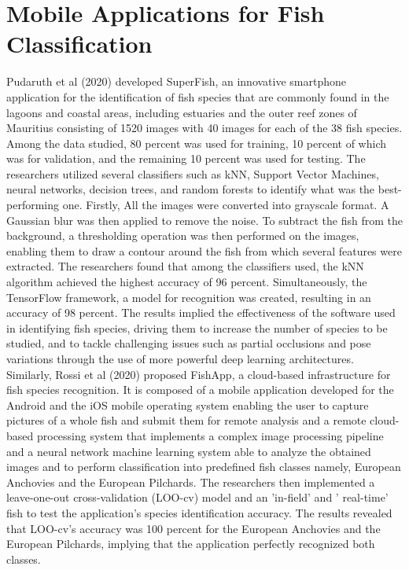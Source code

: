 \section{Mobile Applications for Fish Classification}
Pudaruth et al (2020) developed SuperFish, an innovative smartphone application for the identification of fish species that are commonly found in the lagoons and coastal areas, including estuaries and the outer reef zones of Mauritius consisting of 1520 images with 40 images for each of the 38 fish species. Among the data studied, 80 percent was used for training, 10 percent of which was for validation, and the remaining 10 percent was used for testing. The researchers utilized several classifiers such as kNN, Support Vector Machines, neural networks, decision trees, and random forests to identify what was the best-performing one. Firstly, All the images were converted into grayscale format. A Gaussian blur was then applied to remove the noise. To subtract the fish from the background, a thresholding operation was then performed on the images, enabling them to draw a contour around the fish from which several features were extracted. The researchers found that among the classifiers used, the kNN algorithm achieved the highest accuracy of 96 percent. Simultaneously, the TensorFlow framework, a model for recognition was created, resulting in an accuracy of 98 percent. The results implied the effectiveness of the software used in identifying fish species, driving them to increase the number of species to be studied, and to tackle challenging issues such as partial occlusions and pose variations through the use of more powerful deep learning architectures.
Similarly, Rossi et al (2020) proposed FishApp, a cloud-based infrastructure for fish species recognition. It is composed of a mobile application developed for the Android and the iOS mobile operating system enabling the user to capture pictures of a whole fish and submit them for remote analysis and a remote cloud-based processing system that implements a complex image processing pipeline and a neural network machine learning system able to analyze the obtained images and to perform classification into predefined fish classes namely, European Anchovies and the European Pilchards. The researchers then implemented a leave-one-out cross-validation (LOO-cv) model and an   ’in-field’ and ’ real-time’ fish to test the application’s species identification accuracy. The results revealed that  LOO-cv’s accuracy was 100 percent for the European Anchovies and the European Pilchards, implying that the application perfectly recognized both classes. 
